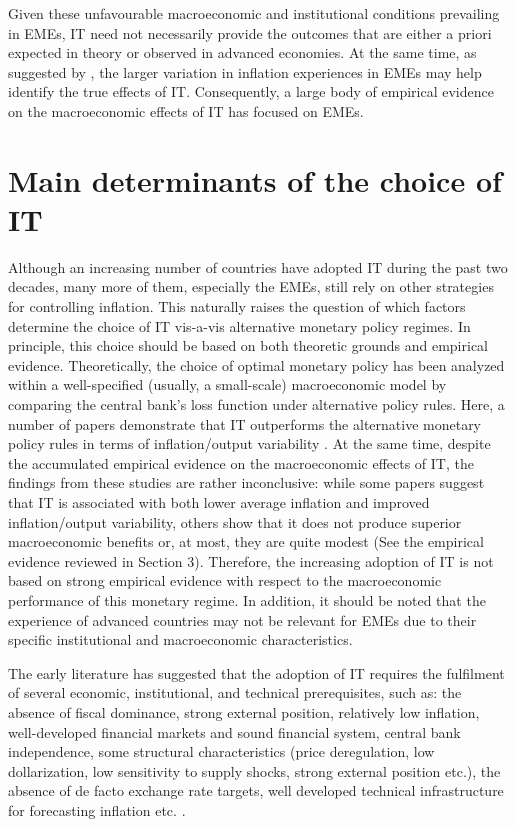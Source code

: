 \documentclass{article}
\begin{document}
Given these unfavourable macroeconomic and institutional conditions prevailing in EMEs, IT need not necessarily provide the outcomes that are either a priori expected in theory or observed in advanced economies. At the same time, as suggested by \citet{walsh2009}, the larger variation in inflation experiences in EMEs may help identify the true effects of IT. Consequently, a large body of empirical evidence on the macroeconomic effects of IT has focused on EMEs.

\section{Main determinants of the choice of IT}

Although an increasing number of countries have adopted IT during the past two decades, many more of them, especially the EMEs, still rely on other strategies for controlling inflation. This naturally raises the question of which factors determine the choice of IT vis-a-vis alternative monetary policy regimes. In principle, this choice should be based on both theoretic grounds and empirical evidence. Theoretically, the choice of optimal monetary policy has been analyzed within a well-specified (usually, a small-scale) macroeconomic model by comparing the central bank’s loss function under alternative policy rules. Here, a number of papers demonstrate that IT outperforms the alternative monetary policy rules in terms of inflation/output variability \citep{Ball1999a, Ball1999b, Haldane1999, Rudebusch1999, Svensson1999a, Svensson1999b, Svensson2000}. At the same time, despite the accumulated empirical evidence on the macroeconomic effects of IT, the findings from these studies are rather inconclusive: while some papers suggest that IT is associated with both lower average inflation and improved inflation/output variability, others show that it does not produce superior macroeconomic benefits or, at most, they are quite modest (See the empirical evidence reviewed in Section 3). Therefore, the increasing adoption of IT is not based on strong empirical evidence with respect to the macroeconomic performance of this monetary regime. In addition, it should be noted that the experience of advanced countries may not be relevant for EMEs due to their specific institutional and macroeconomic characteristics.

The early literature has suggested that the adoption of IT requires the fulfilment of several economic, institutional, and technical prerequisites, such as: the absence of fiscal dominance, strong external position, relatively low inflation, well-developed financial markets and sound financial system, central bank independence, some structural characteristics (price deregulation, low dollarization, low sensitivity to supply shocks, strong external position etc.), the absence of de facto exchange rate targets, well developed technical infrastructure for forecasting inflation etc. \citep{agenor2002, amato2002, carare2002, carare2006, eichengreen1999, freedman2009, Freedman2010, IMF2006, Masson1997, Mishkin2000, Mishkin2002, Mishkin2007}.
\end{document}
